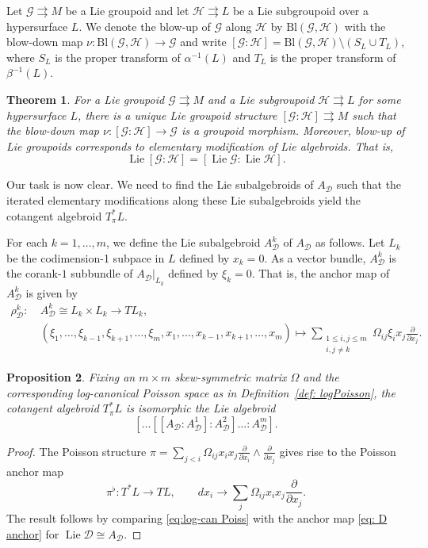 \documentclass{amsart}
\newtheorem{theorem}{Theorem}[section]
\newtheorem{proposition}[theorem]{Proposition}
\numberwithin{equation}{section}
\newcommand{\cD}{\mathcal{D}}
\newcommand{\cG}{\mathcal{G}}
\newcommand{\cH}{\mathcal{H}}
\newcommand{\Lie}{\operatorname{Lie}}
\newcommand{\rra}{\rightrightarrows}
\begin{document}
Let $\cG \rra M$ be a Lie groupoid and let $\cH \rra L$ be a Lie subgroupoid over a hypersurface $L$. We denote the blow-up of $\cG$ along $\cH$ by $\mathrm{Bl}(\cG, \cH)$ with the blow-down map $\nu: \mathrm{Bl}(\cG, \cH) \to \cG$ and write $[\cG\!:\!\cH] = \mathrm{Bl}(\cG, \cH) \setminus (S_L \cup T_L)$, where $S_L$ is the proper transform of $\alpha^{-1}(L)$ and $T_L$ is the proper transform of $\beta^{-1}(L)$.

\begin{theorem} 
  \cite{MR3214314}
  For a Lie groupoid $\cG \rra M$ and a Lie subgroupoid $\cH \rra L$ for some hypersurface $L$, there is a unique Lie groupoid structure $[\cG\!:\!\cH] \rra M$ such that the blow-down map $\nu: [\cG\!:\!\cH] \to \cG$ is a groupoid morphism.
  Moreover, blow-up of Lie groupoids corresponds to elementary modification of Lie algebroids. That is,
  \[\Lie[\cG\!:\!\cH] = [\Lie\cG\!:\!\Lie\cH].\]
\end{theorem}

Our task is now clear.
We need to find the Lie subalgebroids of $A_\cD$ such that the iterated elementary modifications along these Lie subalgebroids yield the cotangent algebroid $T^*_\pi L$.

For each $k = 1, \ldots, m$, we define the Lie subalgebroid $A_\cD^k$ of $A_\cD$ as follows.
Let $L_k$ be the codimension-1 subpace in $L$ defined by $x_k = 0$.
As a vector bundle, $A_\cD^k$ is the corank-$1$ subbundle of $A_\cD |_{L_k}$ defined by $\xi_k = 0$.
That is, the anchor map of $A_\cD^k$ is given by
\begin{align*}
  \rho_\cD^k: ~& A_\cD^k \cong L_k\times L_k \to TL_k, \\
  & (\xi_1, \ldots, \xi_{k-1}, \xi_{k+1}, \ldots, \xi_m, x_1, \ldots, x_{k-1}, x_{k+1}, \ldots, x_m) \mapsto \sum_{\substack{1\le i,j \le m\\ i,j\ne k}} \Omega_{ij}\xi_i x_j\frac{\partial}{\partial x_j}.
\end{align*}

\begin{proposition}
  Fixing an $m\times m$ skew-symmetric matrix $\Omega$ and the corresponding log-canonical Poisson space as in Definition~\ref{def: logPoisson}, the cotangent algebroid $T^*_\pi L$ is isomorphic the Lie algebroid
  \[[\ldots[[A_\cD\!:\!A_\cD^1]\!:\!A_\cD^2] \ldots \!:\!A_\cD^m].\]
\end{proposition}
\begin{proof}
  The Poisson structure $\pi = \sum_{j < i} \Omega_{ij} x_ix_j\frac{\partial}{\partial x_i} \wedge \frac{\partial}{\partial x_j}$ gives rise to the Poisson anchor map
  \begin{equation}	
    \label{eq:log-can Poiss}
    \pi^\flat: T^*L \to TL, \qquad dx_i \to \sum_j \Omega_{ij}  x_ix_j \frac{\partial}{\partial x_j}.
  \end{equation}
  The result follows by comparing \eqref{eq:log-can Poiss} with the anchor map \eqref{eq: D anchor} for $\Lie \cD\cong A_\cD$.
\end{proof}
\end{document}
